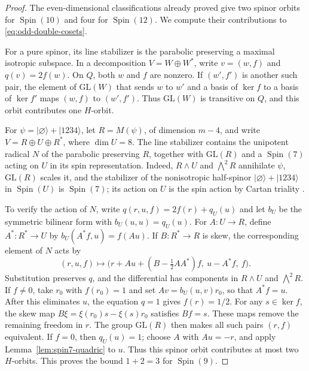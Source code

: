 \documentclass{article}
\theoremstyle{definition}
\theoremstyle{remark}
\newcommand{\Spin}{\operatorname{Spin}}
\newcommand{\ket}[1]{\lvert #1\rangle}
\begin{document}
\begin{proof}
The even-dimensional classifications already proved give two spinor
orbits for $\Spin(10)$ and four for $\Spin(12)$. We compute their
contributions to \eqref{eq:odd-double-cosets}.

For a pure spinor, its line stabilizer is the parabolic preserving a
maximal isotropic subspace. In a decomposition $V=W\oplus W^*$,
write $v=(w,f)$ and $q(v)=2f(w)$. On $Q$, both $w$ and $f$ are nonzero.
If $(w',f')$ is another such pair, the element of $\mathrm{GL}(W)$ that
sends $w$ to $w'$ and a basis of $\ker f$ to a basis of $\ker f'$ maps
$(w,f)$ to $(w',f')$. Thus $\mathrm{GL}(W)$ is transitive on $Q$, and this orbit contributes one $H$-orbit.

For $\psi=\ket\varnothing+\ket{1234}$, let
$R=M(\psi)$, of dimension $m-4$, and write
$V=R\oplus U\oplus R^*$, where $\dim U=8$.
The line stabilizer contains the unipotent radical $N$ of the parabolic
preserving $R$, together with $\mathrm{GL}(R)$ and a $\Spin(7)$
acting on $U$ in its spin representation. Indeed, $R\wedge U$
and $\bigwedge^2R$ annihilate $\psi$, $\mathrm{GL}(R)$ scales it,
and the stabilizer of the nonisotropic half-spinor
$\ket\varnothing+\ket{1234}$ in $\Spin(U)$ is $\Spin(7)$;
its action on $U$ is the spin action by Cartan triality
\cite{Cartan1966,Chevalley1954}.

To verify the action of $N$, write $q(r,u,f)=2f(r)+q_U(u)$ and let
$b_U$ be the symmetric bilinear form with $b_U(u,u)=q_U(u)$.
For $A:U\to R$, define $A^*:R^*\to U$ by
$b_U(A^*f,u)=f(Au)$. If $B:R^*\to R$ is skew, the corresponding
element of $N$ acts by
\begin{equation}
 (r,u,f)\longmapsto
 \bigl(r+Au+(B-\tfrac12AA^*)f,\ u-A^*f,\ f\bigr).
 \label{eq:odd-unipotent-action}
\end{equation}
Substitution preserves $q$, and the differential has components in
$R\wedge U$ and $\bigwedge^2R$.
If $f\ne0$, take $r_0$ with $f(r_0)=1$ and set
$Av=b_U(u,v)r_0$, so that $A^*f=u$. After this eliminates $u$,
the equation $q=1$ gives $f(r)=1/2$. For any $s\in\ker f$, the
skew map $B\xi=\xi(r_0)s-\xi(s)r_0$ satisfies $Bf=s$.
These maps remove the remaining freedom in $r$.
The group $\mathrm{GL}(R)$ then makes all such pairs $(r,f)$ equivalent.
If $f=0$, then $q_U(u)=1$; choose $A$ with $Au=-r$, and apply
Lemma~\ref{lem:spin7-quadric} to $u$.
Thus this spinor orbit contributes at most two $H$-orbits.
This proves the bound $1+2=3$ for $\Spin(9)$.


\end{proof}
\end{document}
